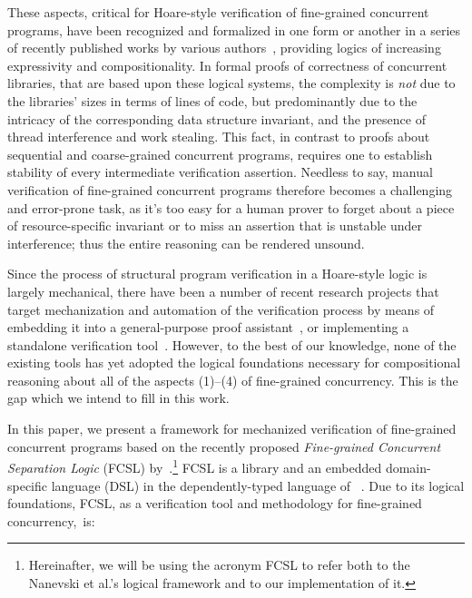 These aspects, critical for Hoare-style verification of fine-grained
concurrent programs, have been recognized and formalized in one form
or another in a series of recently published works by various
authors~\cite{Feng:POPL09,DinsdaleYoung-al:ECOOP10,Jacobs-Piessens:POPL11,Turon-al:ICFP13,Svendsen-Birkedal:ESOP14,ArrozPincho-al:ECOOP14},
providing logics of increasing expressivity and compositionality.
% 
In formal proofs of correctness of concurrent libraries, that are
based upon these logical systems, the complexity is \emph{not} due to
the libraries' sizes in terms of lines of code, but predominantly due
to the intricacy of the corresponding data structure invariant, and
the presence of thread interference and work stealing. This fact, in
contrast to proofs about sequential and coarse-grained concurrent
programs, requires one to establish stability of every intermediate
verification assertion.
%
Needless to say, manual verification of fine-grained concurrent
programs therefore becomes a challenging and error-prone task, as it's
too easy for a human prover to forget about a piece of
resource-specific invariant or to miss an assertion that is unstable
under interference; thus the entire reasoning can be rendered
unsound. 
%
%

Since the process of structural program verification in a Hoare-style
logic is largely mechanical, there have been a number of recent
research projects that target mechanization and automation of the
verification process by means of embedding it into a general-purpose
proof
assistant~\cite{Nanevski-al:ICFP08,Nanevski-al:POPL10,Shao:CACM10,Chlipala:PLDI11},
or implementing a standalone verification
tool~\cite{Leino-Muller:ESOP09,Cohen-al:TPHOL09,Jacobs-al:NFM11}. However,
to the best of our knowledge, none of the existing tools has yet
adopted the logical foundations necessary for compositional reasoning
about all of the aspects (1)--(4) of fine-grained concurrency. This is
the gap which we intend to fill in this work.

In this paper, we present a framework for mechanized verification of
fine-grained concurrent programs based on the recently proposed
\emph{Fine-grained Concurrent Separation Logic} (FCSL)
by~\citet{Nanevski-al:ESOP14}.\footnote{Hereinafter, we will be using
  the acronym FCSL to refer both to the Nanevski et al.'s logical
  framework and to our implementation of it.}
% 
FCSL is a library and an embedded domain-specific language (DSL) in
the dependently-typed language of
~\citeyearpar{Coq-manual}.
% 
Due to its logical foundations, FCSL, as a verification tool and
methodology for fine-grained concurrency,~is:

